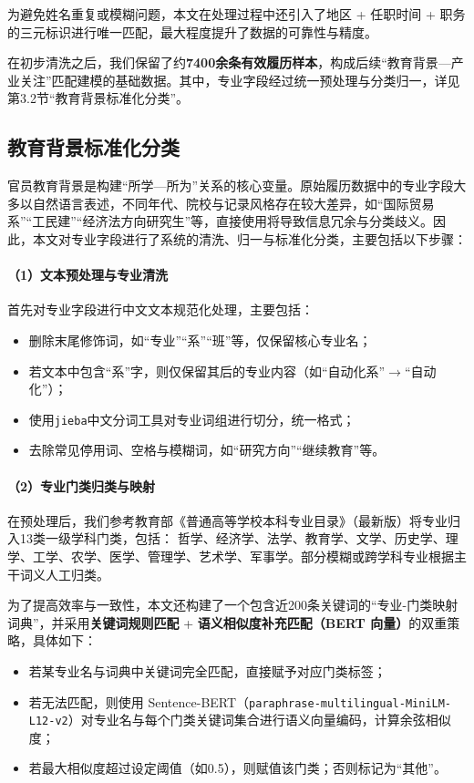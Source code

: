 \documentclass[a4paper,11pt, fontset=fandol]{ctexart}
\begin{document}
为避免姓名重复或模糊问题，本文在处理过程中还引入了地区 + 任职时间 + 职务的三元标识进行唯一匹配，最大程度提升了数据的可靠性与精度。

在初步清洗之后，我们保留了约\textbf{7400余条有效履历样本}，构成后续“教育背景—产业关注”匹配建模的基础数据。其中，专业字段经过统一预处理与分类归一，详见第3.2节“教育背景标准化分类”。



\subsection{教育背景标准化分类}
官员教育背景是构建“所学—所为”关系的核心变量。原始履历数据中的专业字段大多以自然语言表述，不同年代、院校与记录风格存在较大差异，如“国际贸易系”“工民建”“经济法方向研究生”等，直接使用将导致信息冗余与分类歧义。因此，本文对专业字段进行了系统的清洗、归一与标准化分类，主要包括以下步骤：

\paragraph{（1）文本预处理与专业清洗}

首先对专业字段进行中文文本规范化处理，主要包括：
\begin{itemize}
    \item 删除末尾修饰词，如“专业”“系”“班”等，仅保留核心专业名；
    \item 若文本中包含“系”字，则仅保留其后的专业内容（如“自动化系”$\rightarrow$“自动化”）；
    \item 使用\texttt{jieba}中文分词工具对专业词组进行切分，统一格式；
    \item 去除常见停用词、空格与模糊词，如“研究方向”“继续教育”等。
\end{itemize}

\paragraph{（2）专业门类归类与映射}

在预处理后，我们参考教育部《普通高等学校本科专业目录》（最新版）将专业归入13类一级学科门类，包括：
哲学、经济学、法学、教育学、文学、历史学、理学、工学、农学、医学、管理学、艺术学、军事学。部分模糊或跨学科专业根据主干词义人工归类。

为了提高效率与一致性，本文还构建了一个包含近200条关键词的“专业-门类映射词典”，并采用\textbf{关键词规则匹配} + \textbf{语义相似度补充匹配（BERT 向量）}的双重策略，具体如下：
\begin{itemize}
    \item 若某专业名与词典中关键词完全匹配，直接赋予对应门类标签；
    \item 若无法匹配，则使用 Sentence-BERT（\texttt{paraphrase-multilingual-MiniLM-L12-v2}）对专业名与每个门类关键词集合进行语义向量编码，计算余弦相似度；
    \item 若最大相似度超过设定阈值（如0.5），则赋值该门类；否则标记为“其他”。
\end{itemize}
\end{document}

